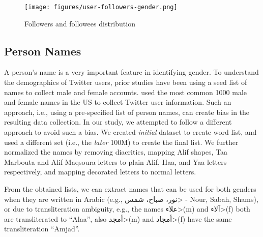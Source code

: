\documentclass[sigconf,authorversion,nonacm]{acmart}
\begin{document}
\begin{figure}[h]
	\begin{center}
		\texttt{[image: figures/user-followers-gender.png]} 
		\caption{Followers and followees distribution}
		\label{fig:user-followers}
	\end{center}
\end{figure}


\subsection{Person Names}
A person's name is a very important feature in identifying gender. To understand the demographics of Twitter users, prior studies have been using a seed list of names to collect male and female accounts. \citet{mislove2011understanding} used the most common 1000 male and female names in the US to collect Twitter user information. Such an approach, i.e., using a pre-specified list of person names,  can create bias in the resulting data collection. In our study, we attempted to follow a different approach to avoid such a bias. We created \textit{initial} dataset to create word list, and used a different set (i.e., the \textit{later} 100M) to create the final list. 
We further normalized the names by removing diacritics, mapping Alif shapes, Taa Marbouta and Alif Maqsoura letters to plain Alif, Haa, and Yaa letters respectively, and mapping decorated letters to normal letters.


From the obtained lists, we can extract names that can be used for both genders when they are written in Arabic (e.g., \<نور، صباح، شمس> - Nour, Sabah, Shams), or due to transliteration ambiguity, e.g., the names \<علاء>(m) and \<آلاء>(f) both are transliterated to ``Alaa'', also \<أمجد>(m) and \<أمجاد>(f) have the same transliteration ``Amjad''. 
\end{document}
